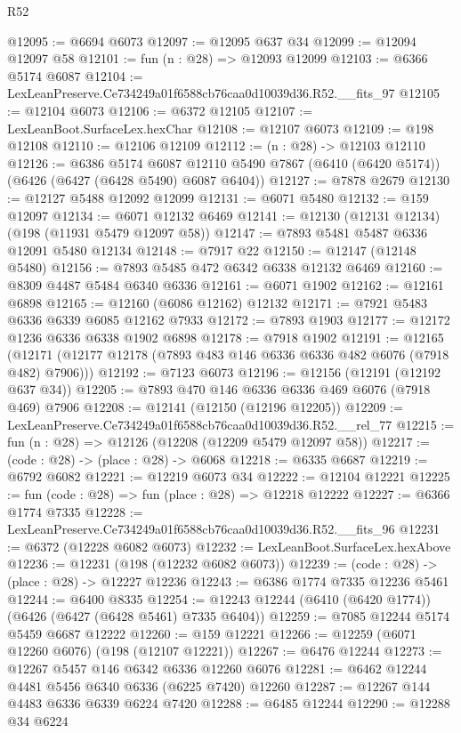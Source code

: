 \begin{lexlean}{R52}
\begin{coremodule}
@12095 := @6694 @6073
@12097 := @12095 @637 @34
@12099 := @12094 @12097 @58
@12101 := fun (n : @28) => @12093 @12099
@12103 := @6366 @5174 @6087
@12104 := LexLeanPreserve.Ce734249a01f6588cb76caa0d10039d36.R52.__fits_97
@12105 := @12104 @6073
@12106 := @6372 @12105
@12107 := LexLeanBoot.SurfaceLex.hexChar
@12108 := @12107 @6073
@12109 := @198 @12108
@12110 := @12106 @12109
@12112 := (n : @28) -> @12103 @12110
@12126 := @6386
    @5174
    @6087
    @12110
    @5490
    @7867
    (@6410 (@6420 @5174))
    (@6426 (@6427 (@6428 @5490) @6087 @6404))
@12127 := @7878 @2679
@12130 := @12127 @5488 @12092 @12099
@12131 := @6071 @5480
@12132 := @159 @12097
@12134 := @6071 @12132 @6469
@12141 := @12130 (@12131 @12134) (@198 (@11931 @5479 @12097 @58))
@12147 := @7893 @5481 @5487 @6336 @12091 @5480 @12134
@12148 := @7917 @22
@12150 := @12147 (@12148 @5480)
@12156 := @7893 @5485 @472 @6342 @6338 @12132 @6469
@12160 := @8309 @4487 @5484 @6340 @6336
@12161 := @6071 @1902
@12162 := @12161 @6898
@12165 := @12160 (@6086 @12162) @12132
@12171 := @7921 @5483 @6336 @6339 @6085 @12162 @7933
@12172 := @7893 @1903
@12177 := @12172 @1236 @6336 @6338 @1902 @6898
@12178 := @7918 @1902
@12191 := @12165
    (@12171 (@12177 @12178 (@7893 @483 @146 @6336 @6336 @482 @6076 (@7918 @482) @7906)))
@12192 := @7123 @6073
@12196 := @12156 (@12191 (@12192 @637 @34))
@12205 := @7893 @470 @146 @6336 @6336 @469 @6076 (@7918 @469) @7906
@12208 := @12141 (@12150 (@12196 @12205))
@12209 := LexLeanPreserve.Ce734249a01f6588cb76caa0d10039d36.R52.__rel_77
@12215 := fun (n : @28) => @12126 (@12208 (@12209 @5479 @12097 @58))
@12217 := (code : @28) -> (place : @28) -> @6068
@12218 := @6335 @6687
@12219 := @6792 @6082
@12221 := @12219 @6073 @34
@12222 := @12104 @12221
@12225 := fun (code : @28) => fun (place : @28) => @12218 @12222
@12227 := @6366 @1774 @7335
@12228 := LexLeanPreserve.Ce734249a01f6588cb76caa0d10039d36.R52.__fits_96
@12231 := @6372 (@12228 @6082 @6073)
@12232 := LexLeanBoot.SurfaceLex.hexAbove
@12236 := @12231 (@198 (@12232 @6082 @6073))
@12239 := (code : @28) -> (place : @28) -> @12227 @12236
@12243 := @6386 @1774 @7335 @12236 @5461
@12244 := @6400 @8335
@12254 := @12243 @12244 (@6410 (@6420 @1774)) (@6426 (@6427 (@6428 @5461) @7335 @6404))
@12259 := @7085 @12244 @5174 @5459 @6687 @12222
@12260 := @159 @12221
@12266 := @12259 (@6071 @12260 @6076) (@198 (@12107 @12221))
@12267 := @6476 @12244
@12273 := @12267 @5457 @146 @6342 @6336 @12260 @6076
@12281 := @6462 @12244 @4481 @5456 @6340 @6336 (@6225 @7420) @12260
@12287 := @12267 @144 @4483 @6336 @6339 @6224 @7420
@12288 := @6485 @12244
@12290 := @12288 @34 @6224

\end{coremodule}
\end{lexlean}
